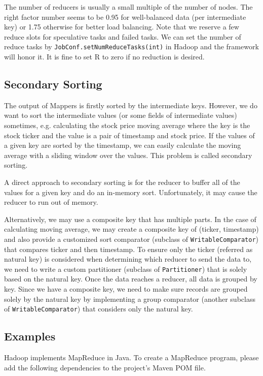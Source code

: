 \documentclass[11pt]{book}
\begin{document}
The number of reducers is usually a small multiple of the number of nodes. The right factor number seems to be 0.95 for well-balanced data (per intermediate key) or 1.75 otherwise for better load balancing. Note that we reserve a few reduce slots for speculative tasks and failed tasks. We can set the number of reduce tasks by \texttt{JobConf.setNumReduceTasks(int)} in Hadoop and the framework will honor it. It is fine to set R to zero if no reduction is desired.

\subsection{Secondary Sorting}
The output of Mappers is firstly sorted by the intermediate keys. However, we do want to sort the intermediate values (or some fields of intermediate values) sometimes, e.g. calculating the stock price moving average where the key is the stock ticker and the value is a pair of timestamp and stock price. If the values of a given key are sorted by the timestamp, we can easily calculate the moving average with a sliding window over the values. This problem is called secondary sorting.

A direct approach to secondary sorting is for the reducer to buffer all of the values for a given key and do an in-memory sort. Unfortunately, it may cause the reducer to run out of memory.

Alternatively, we may use a composite key that has multiple parts. In the case of calculating moving average, we may create a composite key of (ticker, timestamp) and also provide a customized sort comparator (subclass of \texttt{WritableComparator}) that compares ticker and then timestamp.
To ensure only the ticker (referred as natural key) is considered when determining which reducer to send the data to, we need to write a custom partitioner (subclass of \texttt{Partitioner}) that is solely based on the natural key.
Once the data reaches a reducer, all data is grouped by key. Since we have a composite key, we need to make sure records are grouped solely by the natural key by implementing a group comparator (another subclass of \texttt{WritableComparator}) that considers only the natural key.

\subsection{Examples}
Hadoop implements MapReduce in Java. To create a MapReduce program, please add the following dependencies to the project's Maven POM file.
\end{document}
